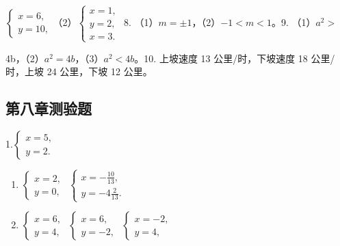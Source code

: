 \(\left\{ \begin{array}{l} x = 6, \\ y = 10, \end{array} \right.\)（2）\(\left\{ \begin{array}{l} x = 1, \\ y = 2, \\ x = 3. \end{array} \right.\)
8. （1）\(m = \pm 1\)，（2）\(-1 < m < 1\)。9. （1）\(a^2 >\)

4b，（2）\(a^2 = 4b\)，（3）\(a^2 < 4b\)。10. 上坡速度 13
公里/时，下坡速度 18 公里/时，上坡 24 公里，下坡 12 公里。

\subsection{第八章测验题}

1.\(\left\{ \begin{array}{l} x = 5, \\ y = 2. \end{array} \right.\)
\begin{enumerate}[start=2]
\item
  \(\left\{ \begin{array}{l} x = 2, \\ y = 0, \end{array} \right.\) \(\left\{ \begin{array}{l} x = -\frac{10}{13}, \\ y = -4\frac{2}{13}. \end{array} \right.\)
\item
  \(\left\{ \begin{array}{l} x = 6, \\ y = 4, \end{array} \right.\) \(\left\{ \begin{array}{l} x = 6, \\ y = -2, \end{array} \right.\) \(\left\{ \begin{array}{l} x = -2, \\ y = 4, \end{array} \right.\)
\end{enumerate}

